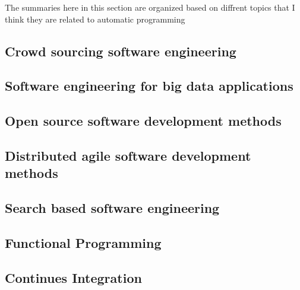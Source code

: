 The summaries here in this section are organized based on diffrent topics that I think they are related to automatic programming

\subsection{Crowd sourcing software engineering}
\label{c:literatur:summaries:crowd-sourcing}


\subsection{Software engineering for big data applications}
\label{c:literatur:summaries:big-data-apps}


\subsection{Open source software development methods}
\label{c:literatur:summaries:OS-software-dev-methods}


\subsection{Distributed agile software development methods}
\label{c:literatur:summaries:dis-agile-dev-methods}


\subsection{Search based software engineering}
\label{c:literatur:summaries:search-based-SE}


\subsection{Functional Programming}
\label{c:literatur:summaries:func-prog}


\subsection{Continues Integration}
\label{c:literatur:summaries:cont-integ}


